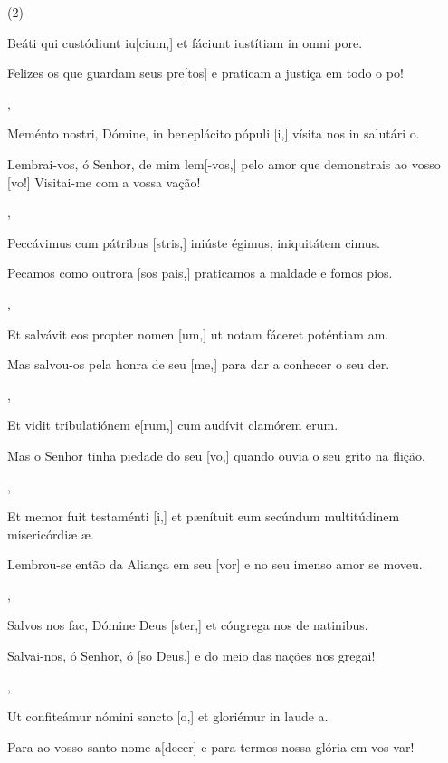 \SetVersePairs(2){
  {\item {}Beáti qui custódiunt iu[cium,] et fáciunt iustítiam in omni pore.}%
    {\item {}Felizes os que guardam seus pre[tos] e praticam a justiça em todo o po!},
  {\item {}Meménto nostri, Dómine, in beneplácito pópuli [i,] vísita nos in salutári o.}%
    {\item {}Lembrai-vos, ó Senhor, de mim lem[-vos,] pelo amor que demonstrais ao vosso [vo!] Visitai-me com a vossa vação!},
  {\item {}Peccávimus cum pátribus [stris,] iniúste égimus, iniquitátem cimus.}%
    {\item {}Pecamos como outrora [sos pais,] praticamos a maldade e fomos pios.},
  {\item {}Et salvávit eos propter nomen [um,] ut notam fáceret poténtiam am.}%
    {\item {}Mas salvou-os pela honra de seu [me,] para dar a conhecer o seu der.},
  {\item {}Et vidit tribulatiónem e[rum,] cum audívit clamórem erum.}%
    {\item {}Mas o Senhor tinha piedade do seu [vo,] quando ouvia o seu grito na flição.},
  {\item {}Et memor fuit testaménti [i,] et pænítuit eum secúndum multitúdinem misericórdiæ æ.}%
    {\item {}Lembrou-se então da Aliança em seu [vor] e no seu imenso amor se moveu.},
  {\item {}Salvos nos fac, Dómine Deus [ster,] et cóngrega nos de natinibus.}%
    {\item {}Salvai-nos, ó Senhor, ó [so Deus,] e do meio das nações nos gregai!},
  {\item {}Ut confiteámur nómini sancto [o,] et gloriémur in laude a.}%
    {\item {}Para ao vosso santo nome a[decer] e para termos nossa glória em vos var!}
}